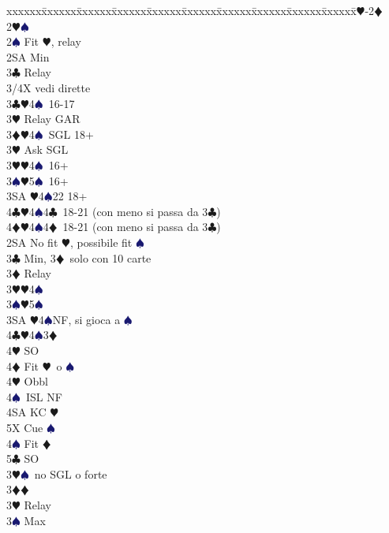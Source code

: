 \documentclass[a4paper,italian]{article}
\newcommand{\BC}{\textcolor{OliveGreen}{$\clubsuit$}}
\newcommand{\BD}{\textcolor{RedOrange}{$\vardiamondsuit$}}
\newcommand{\BH}{\textcolor{Red2}{$\varheartsuit${}}}
\newcommand{\BS}{\textcolor{MidnightBlue}{$\spadesuit${}}}
\newenvironment{bidtable}
{\begin{tabbing}

    xxxxxx\=xxxxxx\=xxxxxx\=xxxxxx\=xxxxxx\=xxxxxx\=xxxxxx\=xxxxxx\=xxxxxx\=xxxxxx\=\kill}
{\end{tabbing} }%
\begin{document}
\begin{multicols}{2}
    \begin{bidtable}
        1\BH-2\BD\\
        2\BH {}\BS \+\\
        2\BS \> Fit \BH , relay\+\\
        2SA \> Min\+\\
        3\BC \> Relay\+\\
        3/4X \> vedi dirette\-\-\\
        3\BC {}\BH 4\BS\ 16-17\+\\
        3\BH \> Relay GAR\-\\
        3\BD {}\BH 4\BS\ SGL 18+\+\\
        3\BH \> Ask SGL\-\\
        3\BH {}\BH 4\BS\ 16+\\
        3\BS {}\BH 5\BS\ 16+\\
        3SA \BH 4\BS 22 18+\\
        4\BC {}\BH 4\BS 4\BC\ 18-21 (con meno si passa da 3\BC )\\
        4\BD {}\BH 4\BS 4\BD\ 18-21 (con meno si passa da 3\BC )\-\\
        2SA \> No fit \BH , possibile fit \BS \+\\
        3\BC \> Min, 3\BD\ solo con 10 carte\+\\
        3\BD \> Relay\+\\
        3\BH {}\BH 4\BS \\
        3\BS {}\BH 5\BS \\
        3SA \BH 4\BS NF, si gioca a \BS \\
        4\BC {}\BH 4\BS 3\BD \+\\
        4\BH \> SO\\
        4\BD \> Fit \BH\ o \BS \+\\
        4\BH \> Obbl\+\\
        4\BS\ ISL NF\\
        4SA KC \BH \\
        5X Cue \BS \-\-\\
        4\BS \> Fit \BD \\
        5\BC \> SO\-\-\\
        3\BH {}\BS\ no SGL o forte\-\\
        3\BD {}\BD \+\\
        3\BH \> Relay\+\\
        3\BS \> Max\+\\

\end{bidtable}
\end{multicols}
\end{document}
